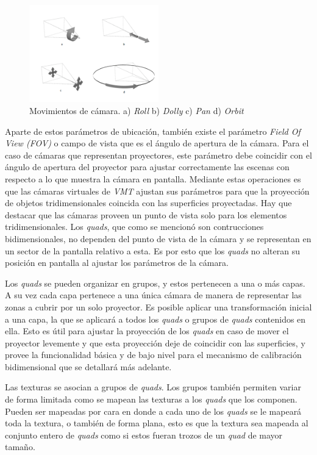 \begin{figure}[H]
  \centering
    \includegraphics[width=0.5\textwidth]{./Cap5_vmt/vmtengine-cameramove.png}
  \caption{Movimientos de cámara. a) \emph{Roll} b) \emph{Dolly} c) \emph{Pan} d) \emph{Orbit}}%
  \label{fig:VMT-CameraMove}
\end{figure}

Aparte de estos parámetros de ubicación, también existe el parámetro \emph{Field Of View (FOV)} o campo de vista que es el ángulo de apertura de la cámara. Para el caso de cámaras que representan proyectores, este parámetro debe coincidir con el ángulo de apertura del proyector para ajustar correctamente las escenas con respecto a lo que muestra la cámara en pantalla.
Mediante estas operaciones es que las cámaras virtuales de \emph{VMT} ajustan sus parámetros para que la proyección de objetos tridimensionales coincida con las superficies proyectadas.
Hay que destacar que las cámaras proveen un punto de vista solo para los elementos tridimensionales. Los \emph{quads}, que como se mencionó son contrucciones bidimensionales, no dependen del punto de vista de la cámara y se representan en un sector de la pantalla relativo a esta. Es por esto que los \emph{quads} no alteran su posición en pantalla al ajustar los parámetros de la cámara.

Los \emph{quads} se pueden organizar en grupos, y estos pertenecen a una o más capas. A su vez cada capa pertenece a una única cámara de manera de representar las zonas a cubrir por un solo proyector. Es posible aplicar una transformación inicial a una capa, la que se aplicará a todos los \emph{quads} o grupos de \emph{quads} contenidos en ella. Esto es útil para ajustar la proyección de los \emph{quads} en caso de mover el proyector levemente y que esta proyección deje de coincidir con las superficies, y provee la funcionalidad básica y de bajo nivel para el mecanismo de calibración bidimensional que se detallará más adelante.

Las texturas se asocian a grupos de \emph{quads}. Los grupos también permiten variar de forma limitada como se mapean las texturas a los \emph{quads} que los componen. Pueden ser mapeadas por cara en donde a cada uno de los \emph{quads} se le mapeará toda la textura, o también de forma plana, esto es que la textura sea mapeada al conjunto entero de \emph{quads} como si estos fueran trozos de un \emph{quad} de mayor tamaño.

